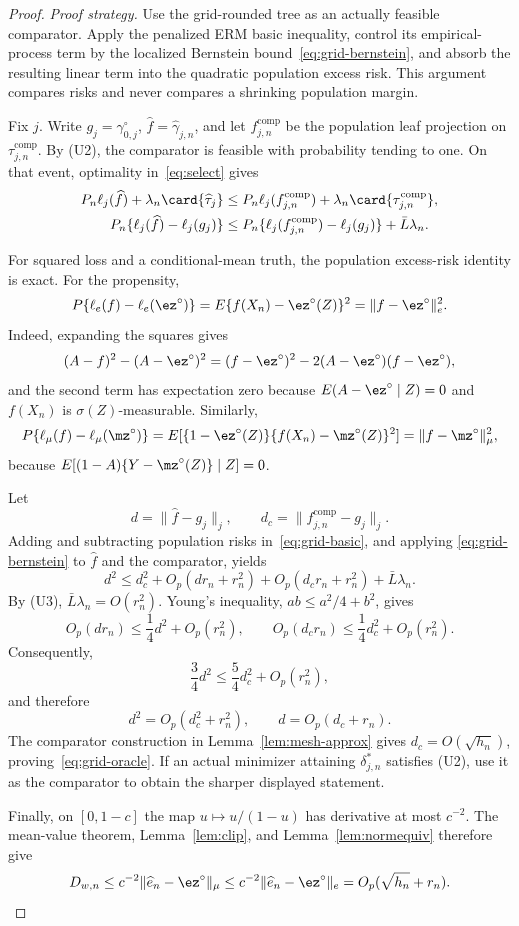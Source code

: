 \begin{proof}
\emph{Proof strategy.}
Use the grid-rounded tree as an actually feasible comparator.  Apply the
penalized ERM basic inequality, control its empirical-process term by the
localized Bernstein bound~\eqref{eq:grid-bernstein}, and absorb the resulting
linear term into the quadratic population excess risk.  This argument compares
risks and never compares a shrinking population margin.

Fix $j$.  Write $g_j=\gamma_{0,j}^\circ$,
$\widehat f=\widehat\gamma_{j,n}$, and let $f^{\mathrm{comp}}_{j,n}$ be the
population leaf projection on $\tau^{\mathrm{comp}}_{j,n}$.  By (U2), the
comparator is feasible with probability tending to one.  On that event,
optimality in~\eqref{eq:select} gives
\begin{align}
 P_n\ell_j(\widehat f)+\lambda_n\card{\widehat\tau_j}
 &\le
 P_n\ell_j(f^{\mathrm{comp}}_{j,n})
   +\lambda_n\card{\tau^{\mathrm{comp}}_{j,n}},\\
 P_n\{\ell_j(\widehat f)-\ell_j(g_j)\}
 &\le
 P_n\{\ell_j(f^{\mathrm{comp}}_{j,n})-\ell_j(g_j)\}
   +\bar L\lambda_n.
 \label{eq:grid-basic}
\end{align}

For squared loss and a conditional-mean truth, the population excess-risk
identity is exact.  For the propensity,
\[
 P\{\ell_e(f)-\ell_e(\ez^\circ)\}
 =E\{f(X_n)-\ez^\circ(Z)\}^2=\|f-\ez^\circ\|_e^2.
\]
Indeed, expanding the squares gives
\[
 (A-f)^2-(A-\ez^\circ)^2
 =(f-\ez^\circ)^2-2(A-\ez^\circ)(f-\ez^\circ),
\]
and the second term has expectation zero because
$E(A-\ez^\circ\mid Z)=0$ and $f(X_n)$ is $\sigma(Z)$-measurable.  Similarly,
\[
 P\{\ell_\mu(f)-\ell_\mu(\mz^\circ)\}
 =E[\{1-\ez^\circ(Z)\}\{f(X_n)-\mz^\circ(Z)\}^2]
 =\|f-\mz^\circ\|_\mu^2,
\]
because
$E[(1-A)\{Y-\mz^\circ(Z)\}\mid Z]=0$.

Let
\[
  d=\|\widehat f-g_j\|_j,\qquad
  d_c=\|f^{\mathrm{comp}}_{j,n}-g_j\|_j.
\]
Adding and subtracting population risks in~\eqref{eq:grid-basic}, and applying
\eqref{eq:grid-bernstein} to $\widehat f$ and the comparator, yields
\[
 d^2
 \le d_c^2+O_p(dr_n+r_n^2)+O_p(d_cr_n+r_n^2)
       +\bar L\lambda_n.
\]
By (U3), $\bar L\lambda_n=O(r_n^2)$.  Young's inequality,
$ab\le a^2/4+b^2$, gives
\[
 O_p(dr_n)\le \frac14d^2+O_p(r_n^2),
 \qquad
 O_p(d_cr_n)\le \frac14d_c^2+O_p(r_n^2).
\]
Consequently,
\[
 \frac34d^2\le\frac54d_c^2+O_p(r_n^2),
\]
and therefore
\[
 d^2=O_p(d_c^2+r_n^2),
 \qquad
 d=O_p(d_c+r_n).
\]
The comparator construction in Lemma~\ref{lem:mesh-approx} gives
$d_c=O(\sqrt{h_n})$, proving~\eqref{eq:grid-oracle}.  If an actual minimizer
attaining $\delta^*_{j,n}$ satisfies (U2), use it as the comparator to obtain
the sharper displayed statement.

Finally, on $[0,1-c]$ the map $u\mapsto u/(1-u)$ has derivative at most
$c^{-2}$.  The mean-value theorem, Lemma~\ref{lem:clip}, and
Lemma~\ref{lem:normequiv} therefore give
\[
 D_{w,n}
 \le c^{-2}\|\widehat e_n-\ez^\circ\|_\mu
 \le c^{-2}\|\widehat e_n-\ez^\circ\|_e
 =O_p(\sqrt{h_n}+r_n).
\]
\end{proof}

